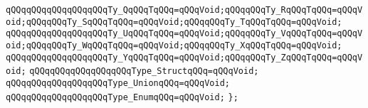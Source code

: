 \verb|qQQqqQQqqQQqqQQqqQQqTy_QqQQqTqQQq=qQQqVoid;qQQqqQQqTy_RqQQqTqQQq=qQQqVoid;qQQqqQQqTy_SqQQqTqQQq=qQQqVoid;qQQqqQQqTy_TqQQqTqQQq=qQQqVoid;|\newline
\verb|qQQqqQQqqQQqqQQqqQQqTy_UqQQqTqQQq=qQQqVoid;qQQqqQQqTy_VqQQqTqQQq=qQQqVoid;qQQqqQQqTy_WqQQqTqQQq=qQQqVoid;qQQqqQQqTy_XqQQqTqQQq=qQQqVoid;|\newline
\verb|qQQqqQQqqQQqqQQqqQQqTy_YqQQqTqQQq=qQQqVoid;qQQqqQQqTy_ZqQQqTqQQq=qQQqVoid;|\newline
\newline
\verb|qQQqqQQqqQQqqQQqqQQqType_StructqQQq=qQQqVoid;|\newline
\verb|qQQqqQQqqQQqqQQqqQQqType_UnionqQQq=qQQqVoid;|\newline
\verb|qQQqqQQqqQQqqQQqqQQqType_EnumqQQq=qQQqVoid;|\newline
\verb|};|\newline

